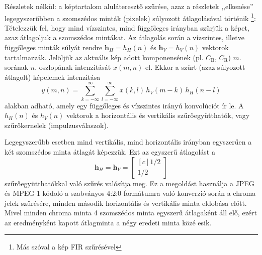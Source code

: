 Részletek nélkül: a képtartalom aluláteresztő szűrése, azaz a részletek ,,elkenése'' legegyszerűbben a szomszédos minták (pixelek) súlyozott átlagolásával történik \footnote{Más szóval a kép FIR szűrésével}: 
Tételezzük fel, hogy mind vízszintes, mind függőleges irányban szűrjük a képet, azaz átlagoljuk a szomszédos mintákat.
Az átlagolás során a vízszintes, illetve függőleges minták súlyát rendre $\mathbf{h}_H = h_H(n)$ és $\mathbf{h}_V = h_V(n)$ vektorok tartalmazzák.
Jelöljük az aktuális kép adott komponensének (pl. $C_{\mathrm{B}}$, $C_{\mathrm{R}}$) $m.$ sorának $n.$ oszlopának intenzitását $x(m,n)$-el.	
Ekkor a szűrt (azaz súlyozott átlagolt) képelemek intenzitása
\begin{equation}
y(m,n) = \sum_{k = -\infty}^{\infty} \sum_{l = -\infty}^{\infty} x(k,l)\, h_V(m-k) \, h_H(n-l)
\end{equation}
alakban adható, amely egy függőleges és vízszintes irányú konvolúciót ír le.
A $h_H(n)$ és $h_V(n)$ vektorok a horizontális és vertikális szűrőegyütthatók, vagy szűrőkernelek (impulzusválaszok).

Legegyszerűbb esetben mind vertikális, mind horizontális irányban egyszerűen a két szomszédos minta átlagát képezzük.
Ezt az egyszerű átlagolást a 
\begin{equation}
\mathbf{h}_H =
\mathbf{h}_V =
\begin{bmatrix}[c]
       1/2 \\[0.3em]
       1/2\end{bmatrix}
\end{equation}
szűrőegyütthatókkal való szűrés valósítja meg.
Ez a megoldást használja a JPEG és MPEG-1 kódoló a szabványos 4:2:0 formátumra való konverzió során a chroma jelek szűrésére, minden második horizontális és vertikális minta eldobása előtt.
Mivel minden chroma minta 4 szomszédos minta egyszerű átlagaként áll elő, ezért az eredményként kapott átlagminta a négy eredeti minta közé esik.


